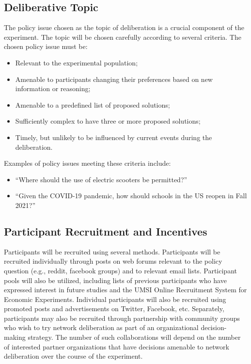 \subsection{Deliberative Topic}
The policy issue chosen as the topic of deliberation is a crucial component
of the experiment.
The topic will be chosen carefully according to several criteria.
The chosen policy issue must be:
\begin{itemize}
\item Relevant to the experimental population;
\item Amenable to participants changing their preferences based on new information or reasoning;
\item Amenable to a predefined list of proposed solutions;
\item Sufficiently complex to have three or more proposed solutions;
\item Timely, but unlikely to be influenced by current events during the deliberation.
\end{itemize}
Examples of policy issues meeting these criteria include:
\begin{itemize}
\item ``Where should the use of electric scooters be permitted?''
\item ``Given the COVID-19 pandemic, how should schools in the US reopen in Fall 2021?''
\end{itemize}


\subsection{Participant Recruitment and Incentives}
Participants will be recruited using several methods.
Participants will be recruited individually through posts on web forums
relevant to the policy question (e.g., reddit, facebook groups)
and to relevant email lists.
Participant pools will also be utilized,
including lists of previous participants
who have expressed interest in future studies
and the UMSI Online Recruitment System for Economic Experiments.
Individual participants will also be recruited using promoted posts and
advertisements on Twitter, Facebook, etc.
Separately, participants may also be recruited through partnership with
community groups who wish to try network deliberation as part of an organizational
decision-making strategy.
The number of such collaborations will depend on the number of interested
partner organizations that have decisions amenable to network deliberation
over the course of the experiment.

